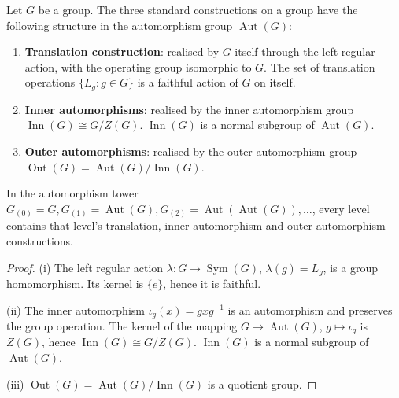 \begin{theorem}\label{thm:three_operations_unity}
Let $G$ be a group. The three standard constructions on a group have the following structure in the automorphism group $\operatorname{Aut}(G)$:
\begin{enumerate}[label=(\roman*)]
    \item \textbf{Translation construction}: realised by $G$ itself through the left regular action, with the operating group isomorphic to $G$. The set of translation operations $\{L_g : g \in G\}$ is a faithful action of $G$ on itself.
    \item \textbf{Inner automorphisms}: realised by the inner automorphism group $\operatorname{Inn}(G) \cong G/Z(G)$. $\operatorname{Inn}(G)$ is a normal subgroup of $\operatorname{Aut}(G)$.
    \item \textbf{Outer automorphisms}: realised by the outer automorphism group $\operatorname{Out}(G) = \operatorname{Aut}(G)/\operatorname{Inn}(G)$.
\end{enumerate}
In the automorphism tower $G_{(0)} = G, G_{(1)} = \operatorname{Aut}(G), G_{(2)} = \operatorname{Aut}(\operatorname{Aut}(G)), \dots$, every level contains that level's translation, inner automorphism and outer automorphism constructions.
\end{theorem}

\begin{proof}
(i) The left regular action $\lambda: G \to \operatorname{Sym}(G)$, $\lambda(g) = L_g$, is a group homomorphism. Its kernel is $\{e\}$, hence it is faithful.

(ii) The inner automorphism $\iota_g(x) = gxg^{-1}$ is an automorphism and preserves the group operation. The kernel of the mapping $G \to \operatorname{Aut}(G)$, $g \mapsto \iota_g$ is $Z(G)$, hence $\operatorname{Inn}(G) \cong G/Z(G)$. $\operatorname{Inn}(G)$ is a normal subgroup of $\operatorname{Aut}(G)$.

(iii) $\operatorname{Out}(G) = \operatorname{Aut}(G)/\operatorname{Inn}(G)$ is a quotient group.
\end{proof}

